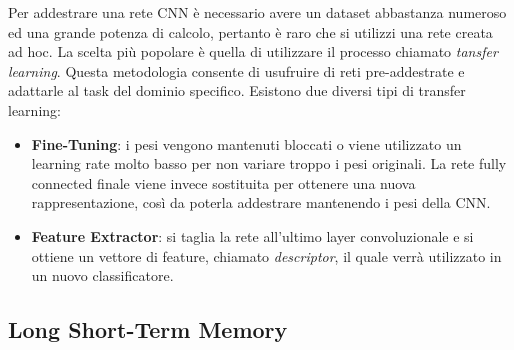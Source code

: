 \documentclass[11pt]{report}
\begin{document}


Per addestrare una rete CNN è necessario avere un dataset abbastanza numeroso ed una grande potenza di calcolo, pertanto è raro che si utilizzi una rete creata ad hoc. La scelta più popolare è quella di utilizzare il processo chiamato \textit{tansfer learning}. Questa metodologia consente di usufruire di reti pre-addestrate e adattarle al task del dominio specifico. Esistono due diversi tipi di transfer learning:
\begin{itemize}
    \item \textbf{Fine-Tuning}: i pesi vengono mantenuti bloccati o viene utilizzato un learning rate molto basso per non variare troppo i pesi originali. La rete fully connected finale viene invece sostituita per ottenere una nuova rappresentazione, così da poterla addestrare mantenendo i pesi della CNN. 
    

    \item \textbf{Feature Extractor}: si taglia la rete all'ultimo layer convoluzionale e si ottiene un vettore di feature, chiamato \textit{descriptor}, il quale verrà utilizzato in un nuovo classificatore.

\end{itemize}

\subsection{Long Short-Term Memory}
\end{document}
